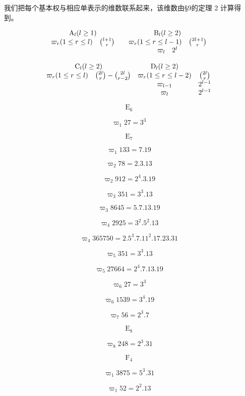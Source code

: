 
我们把每个基本权与相应单表示的维数联系起来，该维数由§9的定理 2 计算得到。

\[
\begin{array}{c c c} \mathrm{A} _ {l} (l \geq 1) & & \mathrm{B} _ {l} (l \geq 2) \\ \varpi_ {r} (1 \leq r \leq l) \quad \binom {l + 1} {r} & & \varpi_ {r} (1 \leq r \leq l - 1) \quad \binom {2 l + 1} {r} \\ & & \varpi_ {l} \quad 2 ^ {l} \end{array}
\]

\[
\begin{array}{c c c} \mathrm{C} _ {l} (l \geq 2) & \mathrm{D} _ {l} (l \geq 2) \\ \varpi_ {r} (1 \leq r \leq l) \quad \binom {2 l} {r} - \binom {2 l} {r - 2} & \varpi_ {r} (1 \leq r \leq l - 2) & \binom {2 l} {r} \\ & \varpi_ {l - 1} & 2 ^ {l - 1} \\ & \varpi_ {l} & 2 ^ {l - 1} \end{array}
\]

\[
\mathrm{E} _ {6}
\]

\[
\varpi_ {1} 27 = 3 ^ {3}
\]

\[
\mathrm{E} _ {7}
\]

\[
\varpi_ {1} 133 = 7.19
\]

\[
\varpi_ {2} 78 = 2.3.13
\]

\[
\varpi_ {2} 912 = 2 ^ {4}.3.19
\]

\[
\varpi_ {3} 351 = 3 ^ {3}.13
\]

\[
\varpi_ {3} 8645 = 5.7.13.19
\]

\[
\varpi_ {4} 2925 = 3 ^ {2}.5 ^ {2}.13
\]

\[
\varpi_ {4} 365750 = 2.5 ^ {3}.7.11 ^ {2}.17.23.31
\]

\[
\varpi_ {5} 351 = 3 ^ {3}.13
\]

\[
\varpi_ {5} 27664 = 2 ^ {4}.7.13.19
\]

\[
\varpi_ {6} 27 = 3 ^ {3}
\]

\[
\varpi_ {6} 1539 = 3 ^ {4}.19
\]

\[
\varpi_ {7} 56 = 2 ^ {3}.7
\]

\[
\mathrm{E} _ {8}
\]

\[
\varpi_ {8} 248 = 2 ^ {3}.31
\]

\[
\mathrm{F} _ {4}
\]

\[
\varpi_ {1} 3875 = 5 ^ {3}.31
\]

\[
\varpi_ {1} 52 = 2 ^ {2}.13
\]

